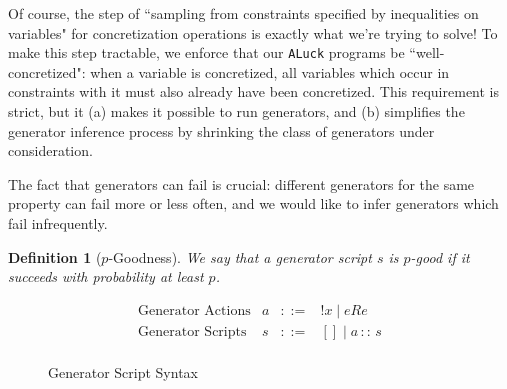 \documentclass[sigconf,nonacm,review,anonymous]{acmart}
\newtheorem{definition}{Definition}
\begin{document}
Of course, the step of ``sampling from constraints specified by inequalities on
variables" for concretization operations is exactly what we're trying to solve!
To make this step tractable, we enforce that our \texttt{ALuck} programs be
``well-concretized": when a variable is concretized, all variables which occur
in constraints with it must also already have been concretized. This requirement
is strict, but it (a) makes it possible to run generators, and (b) simplifies
the generator inference process by shrinking the class of generators under
consideration.



The fact that generators can fail is crucial: different generators for the same property can fail more or
less often, and we would like to infer generators which fail infrequently.
\begin{definition}[$p$-Goodness]
We say that a generator script $s$ is $p$-good if it succeeds with probability at least $p$.
\end{definition}

\begin{figure}
\caption{Generator Script Syntax}
\label{fig:aluck-syntax}
$$
\begin{array}{llll}
\text{Generator Actions} & a & ::= & !x \;|\; e R e\\
\text{Generator Scripts} & s & ::= & [] \;|\; a \, :: \, s\\
\end{array}
$$
\end{figure}
\end{document}
